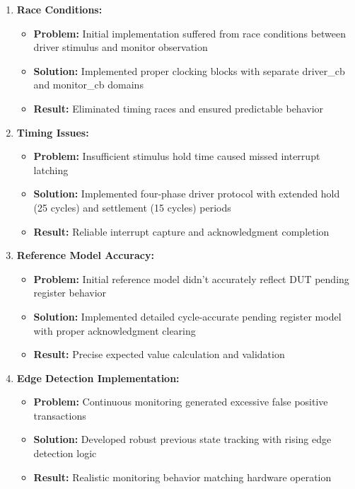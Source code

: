 \documentclass[12pt,a4paper]{article}
\begin{document}
\begin{enumerate}
    \item \textbf{Race Conditions:} 
        \begin{itemize}
            \item \textbf{Problem:} Initial implementation suffered from race conditions between driver stimulus and monitor observation
            \item \textbf{Solution:} Implemented proper clocking blocks with separate driver\_cb and monitor\_cb domains
            \item \textbf{Result:} Eliminated timing races and ensured predictable behavior
        \end{itemize}
    
    \item \textbf{Timing Issues:} 
        \begin{itemize}
            \item \textbf{Problem:} Insufficient stimulus hold time caused missed interrupt latching
            \item \textbf{Solution:} Implemented four-phase driver protocol with extended hold (25 cycles) and settlement (15 cycles) periods
            \item \textbf{Result:} Reliable interrupt capture and acknowledgment completion
        \end{itemize}
    
    \item \textbf{Reference Model Accuracy:} 
        \begin{itemize}
            \item \textbf{Problem:} Initial reference model didn't accurately reflect DUT pending register behavior
            \item \textbf{Solution:} Implemented detailed cycle-accurate pending register model with proper acknowledgment clearing
            \item \textbf{Result:} Precise expected value calculation and validation
        \end{itemize}
    
    \item \textbf{Edge Detection Implementation:} 
        \begin{itemize}
            \item \textbf{Problem:} Continuous monitoring generated excessive false positive transactions
            \item \textbf{Solution:} Developed robust previous state tracking with rising edge detection logic
            \item \textbf{Result:} Realistic monitoring behavior matching hardware operation
        \end{itemize}
\end{enumerate}
\end{document}
